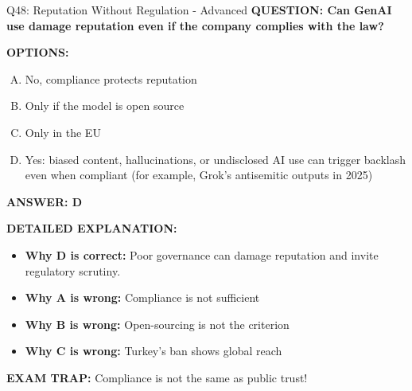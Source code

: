 \documentclass[8pt]{beamer}
\begin{document}
\begin{frame}[shrink=6]{Q48: Reputation Without Regulation - Advanced}
\fontsize{6.5}{7.5}\selectfont
\textbf{QUESTION: Can GenAI use damage reputation even if the company complies with the law?}

\vspace{0.1cm}
\textbf{OPTIONS:}
\begin{enumerate}[A.]
\item No, compliance protects reputation
\item Only if the model is open source
\item Only in the EU
\item Yes: biased content, hallucinations, or undisclosed AI use can trigger backlash even when compliant (for example, Grok's antisemitic outputs in 2025)
\end{enumerate}

\vspace{0.1cm}
\textcolor{myblue}{\textbf{ANSWER: D}}

\vspace{0.1cm}
\textbf{DETAILED EXPLANATION:}
\begin{itemize}
\item \textbf{Why D is correct:} Poor governance can damage reputation and invite regulatory scrutiny.
\item \textbf{Why A is wrong:} Compliance is not sufficient
\item \textbf{Why B is wrong:} Open-sourcing is not the criterion
\item \textbf{Why C is wrong:} Turkey's ban shows global reach
\end{itemize}

\textcolor{myred}{\textbf{EXAM TRAP:}} Compliance is not the same as public trust!
\end{frame}
\end{document}

